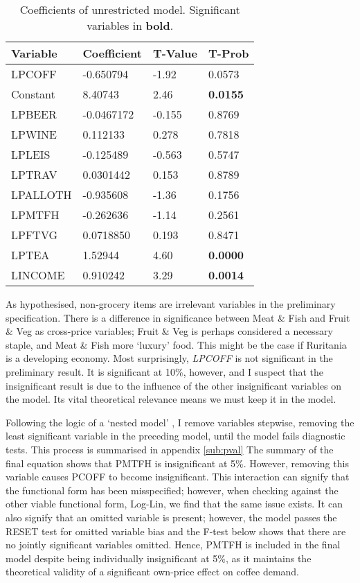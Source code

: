 \documentclass[12pt]{article}
\begin{document}
\begin{table}[!htb]
	\caption{\label{tb:prelim} Coefficients of unrestricted model. Significant variables in \textbf{bold}.}
	\centering
    \begin{tabular}{llll}
    \textbf{Variable} & \textbf{Coefficient} & \textbf{T-Value} & \textbf{T-Prob} \\ \hline
    LPCOFF   & -0.650794   & -1.92   & 0.0573 \\
    Constant & 8.40743     & 2.46    & \textbf{0.0155} \\
    LPBEER   & -0.0467172  & -0.155  & 0.8769 \\
    LPWINE   & 0.112133    & 0.278   & 0.7818 \\
    LPLEIS   & -0.125489   & -0.563  & 0.5747 \\
    LPTRAV   & 0.0301442   & 0.153   & 0.8789 \\
    LPALLOTH & -0.935608   & -1.36   & 0.1756 \\
    LPMTFH   & -0.262636   & -1.14   & 0.2561 \\
    LPFTVG   & 0.0718850   & 0.193   & 0.8471 \\
    LPTEA    & 1.52944     & 4.60    & \textbf{0.0000} \\
    LINCOME  & 0.910242    & 3.29    & \textbf{0.0014} \\
    \end{tabular}
\end{table} %
As hypothesised, non-grocery items are irrelevant variables in the preliminary specification. There is a difference in significance between Meat \& Fish and Fruit \& Veg as cross-price variables;  Fruit \& Veg is perhaps considered a necessary staple, and Meat \& Fish more `luxury' food. This might be the case if Ruritania is a developing economy. Most surprisingly, \emph{LPCOFF} is not significant in the preliminary result. It is significant at 10\%, however, and I suspect that the insignificant result is due to the influence of the other insignificant variables on the model. Its vital theoretical relevance means we must keep it in the model.

Following the logic of a `nested model' \parencite[529]{gujaratiBasicEconometrics2002}, I remove variables stepwise, removing the least significant variable in the preceding model, until the model fails diagnostic tests. This process is summarised in appendix \ref{sub:pval} The summary of the final equation shows that PMTFH is insignificant at 5\%. However, removing this variable causes PCOFF to become insignificant. This interaction can signify that the functional form has been misspecified; however, when checking against the other viable functional form, Log-Lin, we find that the same issue exists. It can also signify that an omitted variable is present; however, the model passes the RESET test for omitted variable bias and the F-test below shows that there are no jointly significant variables omitted. Hence, PMTFH is included in the final model despite being individually insignificant at 5\%, as it maintains the theoretical validity of a significant own-price effect on coffee demand.
\end{document}
